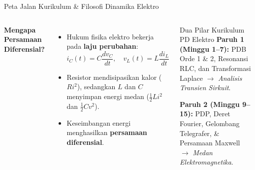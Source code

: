\documentclass[aspectratio=169,10pt]{beamer}
\begin{document}
\begin{frame}{Peta Jalan Kurikulum \& Filosofi Dinamika Elektro}
  \begin{columns}[c]
    \textbf{Mengapa Persamaan Diferensial?}
    \begin{itemize}
      \item Hukum fisika elektro bekerja pada \textbf{laju perubahan}:
      \begin{equation*}
        i_C(t) = C \frac{dv_C}{dt}, \quad v_L(t) = L \frac{di_L}{dt}
      \end{equation*}
      \item Resistor mendisipasikan kalor ($R i^2$), sedangkan $L$ dan $C$ menyimpan energi medan ($\frac{1}{2} L i^2$ dan $\frac{1}{2} C v^2$).
      \item Keseimbangan energi menghasilkan \textbf{persamaan diferensial}.
    \end{itemize}

    \begin{block}{Dua Pilar Kurikulum PD Elektro}
      \textbf{Paruh 1 (Minggu 1--7):}
      PDB Orde 1 \& 2, Resonansi RLC, dan Transformasi Laplace $\rightarrow$ \textit{Analisis Transien Sirkuit}.
      \vspace{0.15cm}

      \textbf{Paruh 2 (Minggu 9--15):}
      PDP, Deret Fourier, Gelombang Telegrafer, \& Persamaan Maxwell $\rightarrow$ \textit{Medan Elektromagnetika}.
    \end{block}
  \end{columns}
\end{frame}
\end{document}
